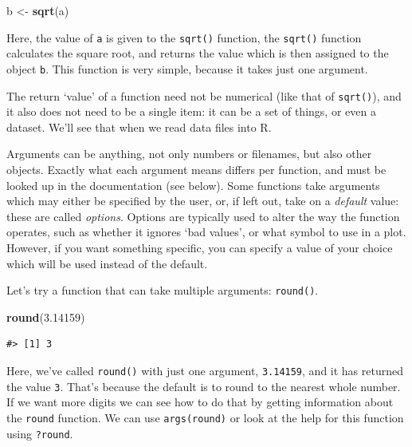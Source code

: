 \documentclass[]{book}
\newenvironment{Shaded}{\begin{snugshade}}{\end{snugshade}}
\newcommand{\KeywordTok}[1]{\textcolor[rgb]{0.13,0.29,0.53}{\textbf{#1}}}
\newcommand{\FloatTok}[1]{\textcolor[rgb]{0.00,0.00,0.81}{#1}}
\newcommand{\StringTok}[1]{\textcolor[rgb]{0.31,0.60,0.02}{#1}}
\newcommand{\NormalTok}[1]{#1}
\begin{document}
\begin{Shaded}
\begin{Highlighting}[]
\NormalTok{b <-}\StringTok{ }\KeywordTok{sqrt}\NormalTok{(a)}
\end{Highlighting}
\end{Shaded}

Here, the value of \texttt{a} is given to the \texttt{sqrt()} function,
the \texttt{sqrt()} function calculates the square root, and returns the
value which is then assigned to the object \texttt{b}. This function is
very simple, because it takes just one argument.

The return `value' of a function need not be numerical (like that of
\texttt{sqrt()}), and it also does not need to be a single item: it can
be a set of things, or even a dataset. We'll see that when we read data
files into R.

Arguments can be anything, not only numbers or filenames, but also other
objects. Exactly what each argument means differs per function, and must
be looked up in the documentation (see below). Some functions take
arguments which may either be specified by the user, or, if left out,
take on a \emph{default} value: these are called \emph{options}. Options
are typically used to alter the way the function operates, such as
whether it ignores `bad values', or what symbol to use in a plot.
However, if you want something specific, you can specify a value of your
choice which will be used instead of the default.

Let's try a function that can take multiple arguments: \texttt{round()}.

\begin{Shaded}
\begin{Highlighting}[]
\KeywordTok{round}\NormalTok{(}\FloatTok{3.14159}\NormalTok{)}
\end{Highlighting}
\end{Shaded}

\begin{verbatim}
#> [1] 3
\end{verbatim}

Here, we've called \texttt{round()} with just one argument,
\texttt{3.14159}, and it has returned the value \texttt{3}. That's
because the default is to round to the nearest whole number. If we want
more digits we can see how to do that by getting information about the
\texttt{round} function. We can use \texttt{args(round)} or look at the
help for this function using \texttt{?round}.
\end{document}
